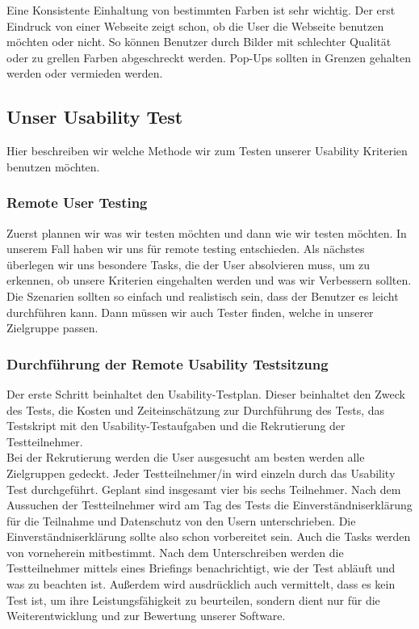 \noindent Eine Konsistente Einhaltung von bestimmten Farben ist sehr wichtig. Der erst Eindruck von
einer Webseite zeigt schon, ob die User die Webseite benutzen möchten oder nicht.
So können Benutzer durch Bilder mit schlechter Qualität oder zu grellen Farben abgeschreckt werden.
Pop-Ups sollten in Grenzen gehalten werden oder vermieden werden.

\subsection{Unser Usability Test}
Hier beschreiben wir welche Methode wir zum Testen unserer Usability Kriterien benutzen
möchten.

\subsubsection{Remote User Testing}

\noindent Zuerst plannen wir was wir testen möchten und dann wie wir testen möchten. In unserem Fall haben wir uns
für remote testing entschieden. Als nächstes überlegen wir uns besondere Tasks, die der User absolvieren muss, um
zu erkennen, ob unsere Kriterien eingehalten werden und was wir Verbessern sollten.
Die Szenarien sollten so einfach und realistisch sein, dass der Benutzer es leicht durchführen kann.
Dann müssen wir auch Tester finden, welche in unserer Zielgruppe passen.

\subsubsection{Durchführung der Remote Usability Testsitzung}

Der erste Schritt beinhaltet den Usability-Testplan. Dieser beinhaltet den Zweck des Tests, 
die Kosten und Zeiteinschätzung zur Durchführung des Tests, das Testskript mit den Usability-Testaufgaben und die Rekrutierung der Testteilnehmer. 
\\

\noindent Bei der Rekrutierung werden die User ausgesucht am besten werden alle Zielgruppen gedeckt. Jeder Testteilnehmer/in wird einzeln durch das Usability Test durchgeführt. 
Geplant sind insgesamt vier bis sechs Teilnehmer. Nach dem Aussuchen der Testteilnehmer wird am Tag des Tests die Einverständniserklärung für die Teilnahme und Datenschutz von den Usern unterschrieben. 
Die Einverständniserklärung sollte also schon vorbereitet sein. Auch die Tasks werden von vorneherein mitbestimmt. Nach dem Unterschreiben werden die Testteilnehmer mittels eines Briefings benachrichtigt, wie der Test abläuft und was zu beachten ist. 
Außerdem wird ausdrücklich auch vermittelt, dass es kein Test ist, um ihre Leistungsfähigkeit zu beurteilen, sondern dient nur für die Weiterentwicklung und zur Bewertung unserer Software.
\\

